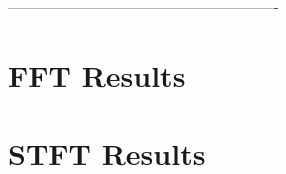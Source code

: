 \documentclass[mestrado, qualificacao]{packages/icmc}
\begin{document}
% 


% 

 ----------------------------------------------------------
\postextual





\glsaddall
\printglossaries


\begin{apendicesenv}

    \chapter{FFT Results}
    \label{chapter:fft-test-results}
    
    
    \chapter{STFT Results}
    \label{chapter:stft-test-results}
    

\end{apendicesenv}




%     

\end{document}
